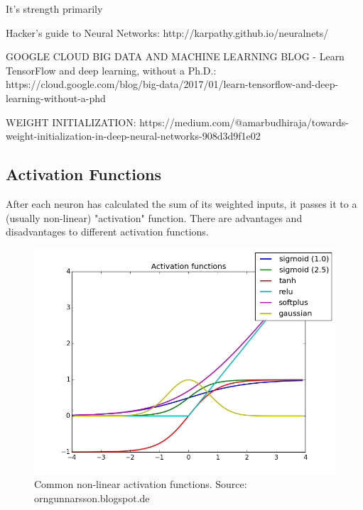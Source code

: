 It's strength primarily 



Hacker's guide to Neural Networks: http://karpathy.github.io/neuralnets/

GOOGLE CLOUD BIG DATA AND MACHINE LEARNING BLOG - Learn TensorFlow and deep learning, without a Ph.D.: https://cloud.google.com/blog/big-data/2017/01/learn-tensorflow-and-deep-learning-without-a-phd


WEIGHT INITIALIZATION: https://medium.com/@amarbudhiraja/towards-weight-initialization-in-deep-neural-networks-908d3d9f1e02


\subsection{Activation Functions}
\label{activation}

After each neuron has calculated the sum of its weighted inputs, it passes it to a (usually non-linear) "activation" function.  There are advantages and disadvantages to different activation functions.



\begin{figure}[h]
    \centering
	\includegraphics[width=.7\textwidth]{./images/illustrations/ActivationFunctions}
    \caption{Common non-linear activation functions. Source: orngunnarsson.blogspot.de}
    \label{fig:actviation}
\end{figure}




